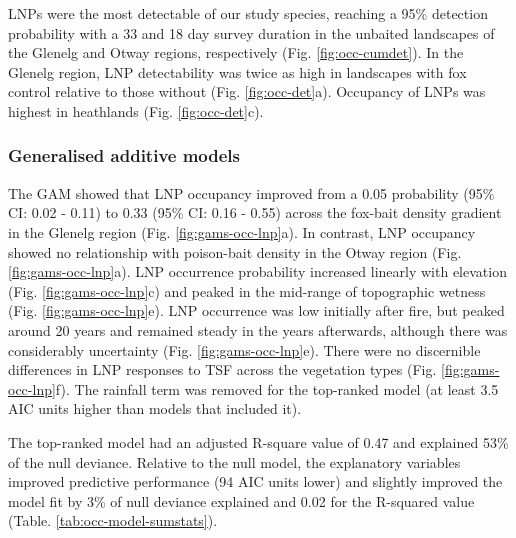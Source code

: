 \documentclass[]{elsarticle} %
\begin{document}
LNPs were the most detectable of our study species, reaching a 95\% detection probability with a 33 and 18 day survey duration in the unbaited landscapes of the Glenelg and Otway regions, respectively (Fig. \ref{fig:occ-cumdet}). In the Glenelg region, LNP detectability was twice as high in landscapes with fox control relative to those without (Fig. \ref{fig:occ-det}a). Occupancy of LNPs was highest in heathlands (Fig. \ref{fig:occ-det}c).

\hypertarget{generalised-additive-models-4}{%
\subsubsection{Generalised additive models}\label{generalised-additive-models-4}}

The GAM showed that LNP occupancy improved from a 0.05 probability (95\% CI: 0.02 - 0.11) to 0.33 (95\% CI: 0.16 - 0.55) across the fox-bait density gradient in the Glenelg region (Fig. \ref{fig:gams-occ-lnp}a). In contrast, LNP occupancy showed no relationship with poison-bait density in the Otway region (Fig. \ref{fig:gams-occ-lnp}a). LNP occurrence probability increased linearly with elevation (Fig. \ref{fig:gams-occ-lnp}c) and peaked in the mid-range of topographic wetness (Fig. \ref{fig:gams-occ-lnp}e). LNP occurrence was low initially after fire, but peaked around 20 years and remained steady in the years afterwards, although there was considerably uncertainty (Fig. \ref{fig:gams-occ-lnp}e). There were no discernible differences in LNP responses to TSF across the vegetation types (Fig. \ref{fig:gams-occ-lnp}f). The rainfall term was removed for the top-ranked model (at least 3.5 AIC units higher than models that included it).

The top-ranked model had an adjusted R-square value of 0.47 and explained 53\% of the null deviance. Relative to the null model, the explanatory variables improved predictive performance (94 AIC units lower) and slightly improved the model fit by 3\% of null deviance explained and 0.02 for the R-squared value (Table. \ref{tab:occ-model-sumstats}).

\newpage
\end{document}
